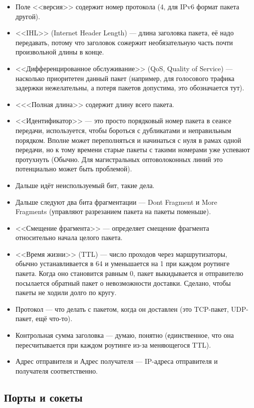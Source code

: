 \documentclass[a5paper]{article}
\begin{document}
\begin{itemize}
    \item Поле <<версия>> содержит номер протокола (4, для IPv6 формат пакета другой).
    \item <<IHL>> (Internet Header Length) --- длина заголовка пакета, её надо передавать, потому что заголовок сожержит необязательную часть почти произвольной длины в конце.
    \item <<Дифференцированное обслуживание>> (QoS, Quality of Service) --- насколько приоритетен данный пакет (например, для голосового трафика задержки нежелательны, а потеря пакетов допустима, это обозначается тут).
    \item <<<Полная длина>> содержит длину всего пакета.
    \item <<Идентификатор>> --- это просто порядковый номер пакета в сеансе передачи, используется, чтобы бороться с дубликатами и неправильным порядком. Вполне может переполняться и начинаться с нуля в рамах одной передачи, но к тому времени старые пакеты с такими номерами уже успевают протухнуть (Обычно. Для магистральных оптоволоконных линий это потенциально может быть проблемой).
    \item Дальше идёт неиспользуемый бит, такие дела.
    \item Дальше следуют два бита фрагментации --- Dont Fragment и More Fragments (управляют разрезанием пакета на пакеты поменьше).
    \item <<Смещение фрагмента>> --- определяет смещение фрагмента относительно начала целого пакета.
    \item <<Время жизни>> (TTL) --- число проходов через маршрутизаторы, обычно устанавливается в 64 и уменьшается на 1 при каждом роутинге пакета. Когда оно становится равным 0, пакет выкидывается и отправителю посылается обратный пакет о невозможности доставки. Сделано, чтобы пакеты не ходили долго по кругу.
    \item Протокол --- что делать с пакетом, когда он доставлен (это TCP-пакет, UDP-пакет, ещё что-то).
    \item Контрольная сумма заголовка --- думаю, понятно (единственное, что она пересчитывается при каждом роутинге из-за меняющегося TTL).
    \item Адрес отправителя и Адрес получателя --- IP-адреса отправителя и получателя соответственно.
\end{itemize}

\subsection{Порты и сокеты}
\end{document}
